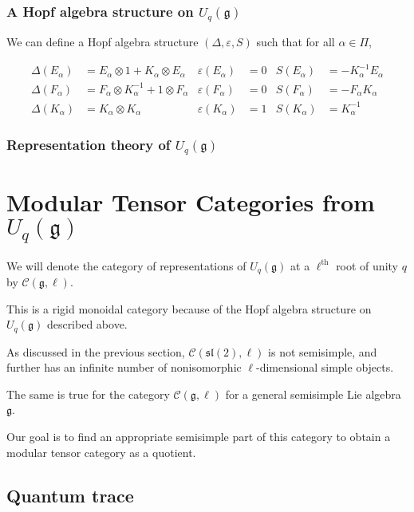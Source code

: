 \documentclass[]{article}
\newcommand{\sll}{\mathfrak{sl}}
\numberwithin{equation}{subsection}
\begin{document}
        \subsubsection{A Hopf algebra structure on $U_q(\mathfrak{g})$}

        We can define a Hopf algebra structure $(\Delta, \varepsilon, S)$ such that for all $\alpha \in \Pi$,

        \begin{align}
            \Delta(E_\alpha) &= E_\alpha \otimes 1 + K_\alpha \otimes E_\alpha      & \varepsilon(E_\alpha) &= 0  & S(E_\alpha) &= -K_\alpha^{-1} E_\alpha \\
            \Delta(F_\alpha) &= F_\alpha \otimes K_\alpha^{-1} + 1 \otimes F_\alpha & \varepsilon(F_\alpha) &= 0  & S(F_\alpha) &= -F_\alpha K_\alpha \\
            \Delta(K_\alpha) &= K_\alpha \otimes K_\alpha                           & \varepsilon(K_\alpha) &= 1  & S(K_\alpha) &= K_\alpha^{-1}
        \end{align}
    \subsubsection{Representation theory of $U_q(\mathfrak{g})$}

\section{Modular Tensor Categories from $U_q(\mathfrak{g})$}
We will denote the category of representations of $U_q(\mathfrak{g})$ at a
$\ell^\text{th}$ root of unity $q$ by $\mathcal{C}(\mathfrak{g}, \ell)$. 

This is a rigid monoidal category because of the Hopf algebra structure on
$U_q(\mathfrak{g})$ described above. 

As discussed in the previous section, $\mathcal{C}(\sll(2),\ell)$ is not
semisimple, and further has an infinite number of nonisomorphic
$\ell$-dimensional simple objects.  

The same is true for the category $\mathcal{C}(\mathfrak{g}, \ell)$ for a
general semisimple Lie algebra $\mathfrak{g}$.

Our goal is to find an appropriate semisimple part of this category to obtain a
modular tensor category as a quotient.




\subsection{Quantum trace}
\end{document}
